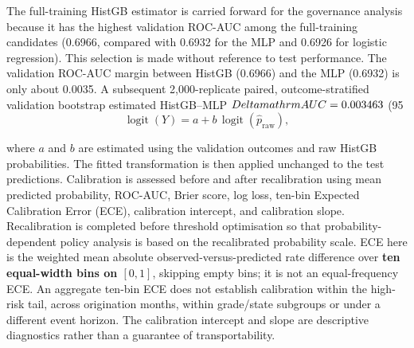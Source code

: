 \documentclass[10pt]{article}
\begin{document}
The full-training HistGB estimator is carried forward for the governance analysis because it has the highest validation ROC-AUC among the full-training candidates (0.6966, compared with 0.6932 for the MLP and 0.6926 for logistic regression). This selection is made without reference to test performance. The validation ROC-AUC margin between HistGB (0.6966) and the MLP (0.6932) is only about 0.0035. A subsequent 2,000-replicate paired, outcome-stratified validation bootstrap estimated HistGB--MLP $\\Delta\\mathrm{AUC}=0.003463$ (95\\%

\[
\operatorname{logit}(Y)=a+b\,\operatorname{logit}(\hat p_{\mathrm{raw}}),
\]

where $a$ and $b$ are estimated using the validation outcomes and raw HistGB probabilities. The fitted transformation is then applied unchanged to the test predictions. Calibration is assessed before and after recalibration using mean predicted probability, ROC-AUC, Brier score, log loss, ten-bin Expected Calibration Error (ECE), calibration intercept, and calibration slope. Recalibration is completed before threshold optimisation so that probability-dependent policy analysis is based on the recalibrated probability scale. ECE here is the weighted mean absolute observed-versus-predicted rate difference over \textbf{ten equal-width bins on $[0,1]$}, skipping empty bins; it is not an equal-frequency ECE. An aggregate ten-bin ECE does not establish calibration within the high-risk tail, across origination months, within grade/state subgroups or under a different event horizon. The calibration intercept and slope are descriptive diagnostics rather than a guarantee of transportability.
\end{document}
